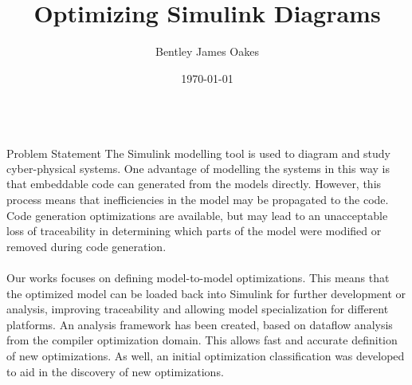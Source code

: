 \documentclass[final,hyperref={pdfpagelabels=false}]{beamer}
\title{Optimizing Simulink\textsuperscript{\textregistered} Diagrams}
\author{Bentley James Oakes}
\institute[McGill University]{McGill University, Montreal, Canada}
\date{\today}
\begin{document}
  \begin{frame}{} 
  \vspace{-1.8cm}
      \begin{columns}[t]
        \begin{column}{.993\linewidth}
        \begin{block}{\large Problem Statement}
        \small
   		The Simulink\textsuperscript{\textregistered} modelling tool is used to diagram and study cyber-physical systems. One advantage
   		of modelling the systems in this way is that embeddable code can generated from the models directly.
   		However, this process means that inefficiencies in the model may be propagated to the code. Code
   		generation optimizations are available, but may lead to an unacceptable loss of traceability in determining
   		which parts of the model were modified or removed during code generation.\\~\\
   	    Our works focuses on defining model-to-model optimizations. This means that the optimized
   		model can be loaded back into Simulink for further development or analysis, improving traceability and
   		allowing model specialization for different platforms. An analysis framework has been created, based on
   		dataflow analysis from the compiler optimization domain. This allows fast and accurate definition of new
   		optimizations. As well, an initial optimization classification was developed to aid in the discovery of new
   		optimizations.
        \end{block}
        \end{column}
      \end{columns}         


\end{frame}
\end{document}
